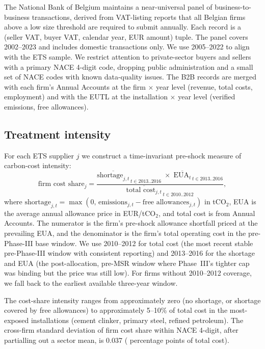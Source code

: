 The National Bank of Belgium maintains a near-universal panel of business-to-business transactions, derived from VAT-listing reports that all Belgian firms above a low size threshold are required to submit annually. Each record is a (seller VAT, buyer VAT, calendar year, EUR amount) tuple. The panel covers 2002--2023 and includes domestic transactions only. We use 2005--2022 to align with the ETS sample. We restrict attention to private-sector buyers and sellers with a primary NACE 4-digit code, dropping public administration and a small set of NACE codes with known data-quality issues. The B2B records are merged with each firm's Annual Accounts at the firm $\times$ year level (revenue, total costs, employment) and with the EUTL at the installation $\times$ year level (verified emissions, free allowances).

\subsection{Treatment intensity}

For each ETS supplier $j$ we construct a time-invariant pre-shock measure of carbon-cost intensity:
\begin{equation}
    \text{firm cost share}_j = \frac{\overline{\text{shortage}_{j,t}}_{\,t \in 2013..2016}\;\times\;\overline{\text{EUA}_t}_{\,t \in 2013..2016}}{\overline{\text{total cost}_{j,t}}_{\,t \in 2010..2012}},
    \label{eq:fcs}
\end{equation}
where $\text{shortage}_{j,t} = \max(0,\,\text{emissions}_{j,t} - \text{free allowances}_{j,t})$ in tCO$_2$, EUA is the average annual allowance price in EUR/tCO$_2$, and total cost is from Annual Accounts. The numerator is the firm's pre-shock allowance shortfall priced at the prevailing EUA, and the denominator is the firm's total operating cost in the pre-Phase-III base window. We use 2010--2012 for total cost (the most recent stable pre-Phase-III window with consistent reporting) and 2013--2016 for the shortage and EUA (the post-allocation, pre-MSR window where Phase~III's tighter cap was binding but the price was still low). For firms without 2010--2012 coverage, we fall back to the earliest available three-year window.

The cost-share intensity ranges from approximately zero (no shortage, or shortage covered by free allowances) to approximately 5--10\% of total cost in the most-exposed installations (cement clinker, primary steel, refined petroleum). The cross-firm standard deviation of firm cost share within NACE 4-digit, after partialling out a sector mean, is 0.037 ( percentage points of total cost).

